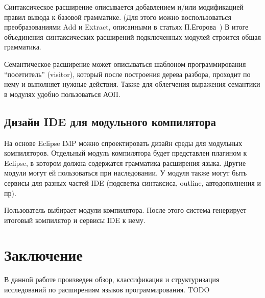 \documentclass[a4paper,12pt]{article}
\begin{document}
Синтаксическое расширение описывается добавлением и/или модификацией правил
вывода к базовой грамматике. (Для этого можно воспользоваться преобразованиями
Add и Extract, описанными в статьях П.Егорова~\cite{Egor}) В итоге объединения
синтаксических расширений подключенных модулей строится общая грамматика.

Семантическое расширение может описываться шаблоном программирования
``посетитель'' (visitor), который после построения дерева разбора, проходит по
нему и выполняет нужные действия. Также для облегчения выражения семантики в
модулях удобно пользоваться АОП.

\subsection{Дизайн IDE для модульного компилятора}

На основе Eclipse IMP можно спроектировать дизайн среды для модульных
компиляторов.
Отдельный модуль компилятора будет представлен плагином к Eclipse, в котором
должна содержатся грамматика расширения языка. Другие модули могут ей
пользоваться при наследовании. У модуля также могут быть сервисы для разных
частей IDE (подсветка синтаксиса, outline, автодополнения и пр).

Пользователь выбирает модули компилятора. После этого система генерирует
итоговый компилятор и сервисы IDE к нему.

\section{Заключение}

В данной работе произведен обзор, классификация и структуризация исследований
по расширениям языков программирования.
TODO

\small



\end{document}
